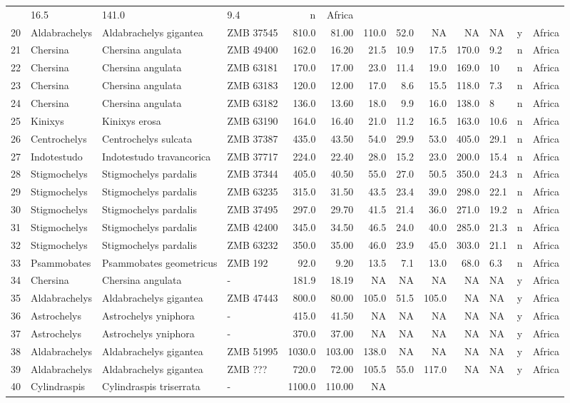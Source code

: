 \documentclass[]{article}
\begin{document}
\begin{longtable}[]{@{}llllrrrrrrlll@{}}
& 16.5 & 141.0 & 9.4 & n & Africa\tabularnewline
20 & Aldabrachelys & Aldabrachelys gigantea & ZMB 37545 & 810.0 & 81.00
& 110.0 & 52.0 & NA & NA & NA & y & Africa\tabularnewline
21 & Chersina & Chersina angulata & ZMB 49400 & 162.0 & 16.20 & 21.5 &
10.9 & 17.5 & 170.0 & 9.2 & n & Africa\tabularnewline
22 & Chersina & Chersina angulata & ZMB 63181 & 170.0 & 17.00 & 23.0 &
11.4 & 19.0 & 169.0 & 10 & n & Africa\tabularnewline
23 & Chersina & Chersina angulata & ZMB 63183 & 120.0 & 12.00 & 17.0 &
8.6 & 15.5 & 118.0 & 7.3 & n & Africa\tabularnewline
24 & Chersina & Chersina angulata & ZMB 63182 & 136.0 & 13.60 & 18.0 &
9.9 & 16.0 & 138.0 & 8 & n & Africa\tabularnewline
25 & Kinixys & Kinixys erosa & ZMB 63190 & 164.0 & 16.40 & 21.0 & 11.2 &
16.5 & 163.0 & 10.6 & n & Africa\tabularnewline
26 & Centrochelys & Centrochelys sulcata & ZMB 37387 & 435.0 & 43.50 &
54.0 & 29.9 & 53.0 & 405.0 & 29.1 & n & Africa\tabularnewline
27 & Indotestudo & Indotestudo travancorica & ZMB 37717 & 224.0 & 22.40
& 28.0 & 15.2 & 23.0 & 200.0 & 15.4 & n & Africa\tabularnewline
28 & Stigmochelys & Stigmochelys pardalis & ZMB 37344 & 405.0 & 40.50 &
55.0 & 27.0 & 50.5 & 350.0 & 24.3 & n & Africa\tabularnewline
29 & Stigmochelys & Stigmochelys pardalis & ZMB 63235 & 315.0 & 31.50 &
43.5 & 23.4 & 39.0 & 298.0 & 22.1 & n & Africa\tabularnewline
30 & Stigmochelys & Stigmochelys pardalis & ZMB 37495 & 297.0 & 29.70 &
41.5 & 21.4 & 36.0 & 271.0 & 19.2 & n & Africa\tabularnewline
31 & Stigmochelys & Stigmochelys pardalis & ZMB 42400 & 345.0 & 34.50 &
46.5 & 24.0 & 40.0 & 285.0 & 21.3 & n & Africa\tabularnewline
32 & Stigmochelys & Stigmochelys pardalis & ZMB 63232 & 350.0 & 35.00 &
46.0 & 23.9 & 45.0 & 303.0 & 21.1 & n & Africa\tabularnewline
33 & Psammobates & Psammobates geometricus & ZMB 192 & 92.0 & 9.20 &
13.5 & 7.1 & 13.0 & 68.0 & 6.3 & n & Africa\tabularnewline
34 & Chersina & Chersina angulata & - & 181.9 & 18.19 & NA & NA & NA &
NA & NA & y & Africa\tabularnewline
35 & Aldabrachelys & Aldabrachelys gigantea & ZMB 47443 & 800.0 & 80.00
& 105.0 & 51.5 & 105.0 & NA & NA & y & Africa\tabularnewline
36 & Astrochelys & Astrochelys yniphora & - & 415.0 & 41.50 & NA & NA &
NA & NA & NA & y & Africa\tabularnewline
37 & Astrochelys & Astrochelys yniphora & - & 370.0 & 37.00 & NA & NA &
NA & NA & NA & y & Africa\tabularnewline
38 & Aldabrachelys & Aldabrachelys gigantea & ZMB 51995 & 1030.0 &
103.00 & 138.0 & NA & NA & NA & NA & y & Africa\tabularnewline
39 & Aldabrachelys & Aldabrachelys gigantea & ZMB ??? & 720.0 & 72.00 &
105.5 & 55.0 & 117.0 & NA & NA & y & Africa\tabularnewline
40 & Cylindraspis & Cylindraspis triserrata & - & 1100.0 & 110.00 & NA &

\end{longtable}
\end{document}
